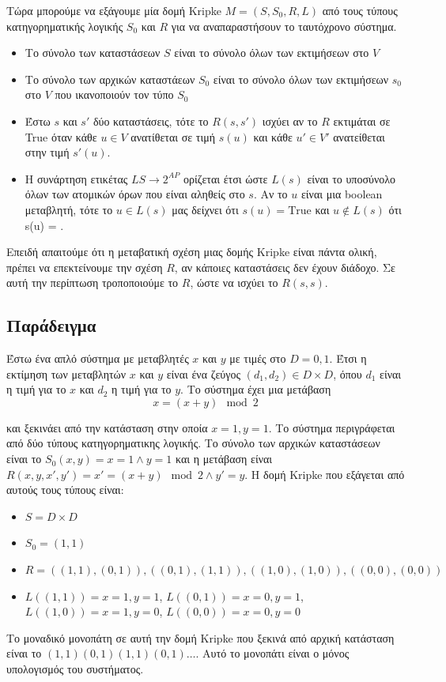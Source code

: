 \documentclass{article}
\newcommand{\english}[1]{\foreignlanguage{english}{{#1}}}
\begin{document}
Τώρα μπορούμε να εξάγουμε μία δομή \english{Kripke} $M = (S, S_0, R, L)$ από τους τύπους κατηγορηματικής λογικής $S_0$ και $R$ για να αναπαραστήσουν το ταυτόχρονο σύστημα.  

\begin{itemize}
    \item Το σύνολο των καταστάσεων $S$ είναι το σύνολο όλων των εκτιμήσεων στο $V$
    \item Το σύνολο των αρχικών καταστάεων $S_0$ είναι το σύνολο όλων των εκτιμήσεων $s_0$ στο $V$ που ικανοποιούν τον τύπο $S_0$
    \item Έστω $s$ και $s'$ δύο καταστάσεις, τότε το $R(s, s')$ ισχύει αν το $R$ εκτιμάται σε \english{True} όταν κάθε $u \in V$ ανατίθεται σε τιμή $s(u)$ και κάθε $u' \in V'$ ανατείθεται στην τιμή $s'(u)$.
    \item Η συνάρτηση ετικέτας $L S \rightarrow 2^{AP}$ ορίζεται έτσι ώστε $L(s)$ είναι το υποσύνολο όλων των ατομικών όρων που είναι αληθείς στο $s$. Αν το $u$ είναι μια \english{boolean} μεταβλητή, τότε το $u \in L(s)$ μας δείχνει ότι \english{$s(u) = \text{True}$} και $u \notin L(s)$ ότι \english{s(u) = }.
\end{itemize}

Επειδή απαιτούμε ότι η μεταβατική σχέση μιας δομής \english{Kripke} είναι πάντα ολική, πρέπει να επεκτείνουμε την σχέση $R$, αν κάποιες καταστάσεις δεν έχουν διάδοχο. Σε αυτή την περίπτωση τροποποιούμε το $R$, ώστε να ισχύει το $R(s,s)$. 

\subsection*{Παράδειγμα}

Έστω ένα απλό σύστημα με μεταβλητές $x$ και $y$ με τιμές στο $D = {0,1}$. Έτσι η εκτίμηση των μεταβλητών $x$ και $y$ είναι ένα ζεύγος $(d_1, d_2) \in D \times D$, όπου $d_1$ είναι η τιμή για το $x$ και $d_2$ η τιμή για το $y$. Το σύστημα έχει μια μετάβαση
\begin{equation*}
    x = (x+y) \mod{2}
\end{equation*}

και ξεκινάει από την κατάσταση στην οποία $x = 1, y = 1$. Το σύστημα περιγράφεται από δύο τύπους κατηγορηματικης λογικής. Το σύνολο των αρχικών καταστάσεων είναι το $S_0(x,y) = x=1 \wedge y = 1$ και η μετάβαση είναι $R(x,y,x',y') = x' = (x+y) \mod{2} \wedge y' = y$. Η δομή \english{Kripke} που εξάγεται από αυτούς τους τύπους είναι:
\begin{itemize}
    \item $S = D \times D$
    \item $S_0 = {(1,1)}$
    \item $R = {((1,1),(0,1)),((0,1),(1,1)),((1,0),(1,0)),((0,0),(0,0))}$
    \item $L((1,1)) = {x=1,y=1}$, $L((0,1)) = {x=0,y=1}$, $L((1,0)) = {x=1, y=0}$, $L((0,0)) = {x=0,y=0}$
\end{itemize}
 Το μοναδικό μονοπάτη σε αυτή την δομή \english{Kripke} που ξεκινά από αρχική κατάσταση είναι το $(1,1)(0,1)(1,1)(0,1)\ldots$. Αυτό το μονοπάτι είναι ο μόνος υπολογισμός του συστήματος.
\end{document}
